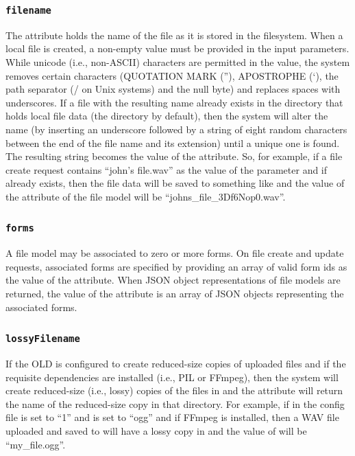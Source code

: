 \documentclass[letterpaper,10pt,english]{sphinxmanual}
\begin{document}
\subsubsection{\texttt{filename}}
\label{datastructure:filename}
The  attribute holds the name of the file as it is stored in the
filesystem.  When a local file is created, a non-empty  value must
be provided in the input parameters.  While unicode (i.e., non-ASCII) characters
are permitted in the  value, the system removes certain characters
(QUOTATION MARK (''), APOSTROPHE (`), the path separator (/ on Unix systems) and
the null byte) and replaces spaces with underscores.  If a file with the
resulting name already exists in the directory that holds local file data (the
 directory by default), then the system will alter the name (by
inserting an underscore followed by a string of eight random characters between
the end of the file name and its extension) until a unique one is found.  The
resulting string becomes the value of the  attribute.  So, for
example, if a file create request contains ``john's file.wav'' as the value of the
 parameter and if  already exists, then the
file data will be saved to something like  and
the value of the  attribute of the file model will be
``johns\_file\_3Df6Nop0.wav''.


\subsubsection{\texttt{forms}}
\label{datastructure:id14}
A file model may be associated to zero or more forms.  On file create and update
requests, associated forms are specified by providing an array of valid form ids
as the value of the  attribute.  When JSON object representations of
file models are returned, the value of the  attribute is an array of
JSON objects representing the associated forms.


\subsubsection{\texttt{lossyFilename}}
\label{datastructure:lossyfilename}
If the OLD is configured to create reduced-size copies of uploaded files and if
the requisite dependencies are installed (i.e., PIL or FFmpeg), then the system
will create reduced-size (i.e., lossy) copies of the files in
 and the  attribute will return the
name of the reduced-size copy in that directory.  For example, if in the config
file  is set to ``1'' and
 is set to ``ogg'' and if FFmpeg is installed,
then a WAV file uploaded and saved to  will have a lossy
copy in  and the value of 
will be ``my\_file.ogg''.
\end{document}
